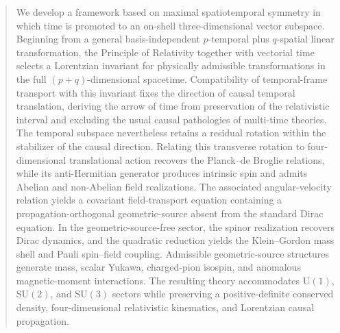 
\begin{abstract}
We develop a framework based on maximal spatiotemporal symmetry in which time is promoted to an on-shell three-dimensional vector subspace. Beginning from a general basis-independent $p$-temporal plus $q$-spatial linear transformation, the Principle of Relativity together with vectorial time selects a Lorentzian invariant for physically admissible transformations in the full $(p+q)$-dimensional spacetime. Compatibility of temporal-frame transport with this invariant fixes the direction of causal temporal translation, deriving the arrow of time from preservation of the relativistic interval and excluding the usual causal pathologies of multi-time theories. The temporal subspace nevertheless retains a residual rotation within the stabilizer of the causal direction. Relating this transverse rotation to four-dimensional translational action recovers the Planck--de Broglie relations, while its anti-Hermitian generator produces intrinsic spin and admits Abelian and non-Abelian field realizations. The associated angular-velocity relation yields a covariant field-transport equation containing a propagation-orthogonal geometric-source absent from the standard Dirac equation. In the geometric-source-free sector, the spinor realization recovers Dirac dynamics, and the quadratic reduction yields the Klein--Gordon mass shell and Pauli spin--field coupling. Admissible geometric-source structures generate mass, scalar Yukawa, charged-pion isospin, and anomalous magnetic-moment interactions. The resulting theory accommodates $\mathrm{U}(1)$, $\mathrm{SU}(2)$, and $\mathrm{SU}(3)$ sectors while preserving a positive-definite conserved density, four-dimensional relativistic kinematics, and Lorentzian causal propagation.
\end{abstract}
